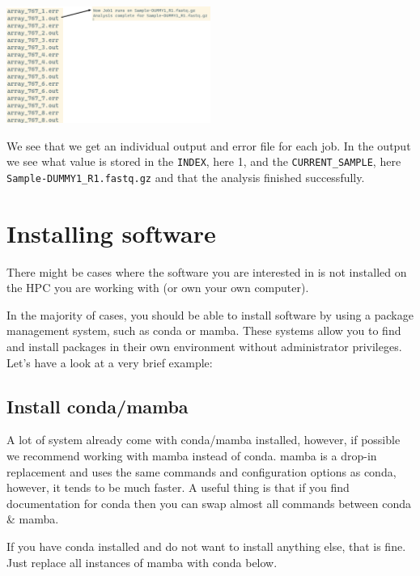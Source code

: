 \documentclass[
  letterpaper,
  DIV=11,
  numbers=noendperiod]{scrreprt}
\begin{document}
\begin{tcolorbox}
\begin{center}
\includegraphics[width=0.5\textwidth,height=\textheight]{../img/arrays2.png}
\end{center}

We see that we get an individual output and error file for each job. In
the output we see what value is stored in the \texttt{INDEX}, here 1,
and the \texttt{CURRENT\_SAMPLE}, here
\texttt{Sample-DUMMY1\_R1.fastq.gz} and that the analysis finished
successfully.

\end{tcolorbox}

\section{Installing software}\label{installing-software}

There might be cases where the software you are interested in is not
installed on the HPC you are working with (or own your own computer).

In the majority of cases, you should be able to install software by
using a package management system, such as conda or mamba. These systems
allow you to find and install packages in their own environment without
administrator privileges. Let's have a look at a very brief example:

\subsection{Install conda/mamba}\label{install-condamamba}

A lot of system already come with conda/mamba installed, however, if
possible we recommend working with mamba instead of conda. mamba is a
drop-in replacement and uses the same commands and configuration options
as conda, however, it tends to be much faster. A useful thing is that if
you find documentation for conda then you can swap almost all commands
between conda \& mamba.

If you have conda installed and do not want to install anything else,
that is fine. Just replace all instances of mamba with conda below.
\end{document}
